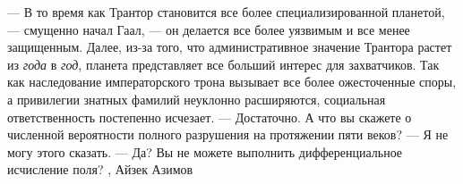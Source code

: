 — В то время как Трантор становится все более специализированной планетой, —
смущенно начал Гаал, — он делается все более уязвимым и все менее защищенным.
Далее, из-за того, что административное значение Трантора растет из \emph{года} в \emph{год},
планета представляет все больший интерес для захватчиков. Так как наследование
императорского трона вызывает все более ожесточенные споры, а привилегии
знатных фамилий неуклонно расширяются, социальная ответственность постепенно
исчезает.  — Достаточно. А что вы скажете о численной вероятности полного
разрушения на протяжении пяти веков?  — Я не могу этого сказать.  — Да? Вы не
можете выполнить дифференциальное исчисление поля?
, Айзек Азимов

